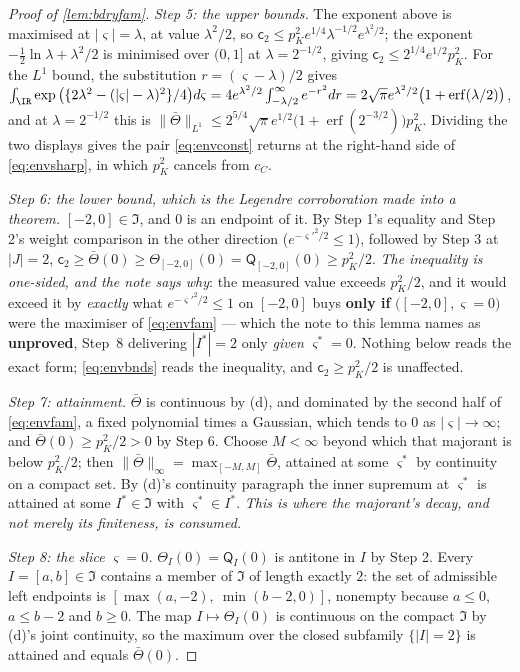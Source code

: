 \begin{proof}[Proof of \cref{lem:bdryfam}]
\emph{Step 5: the upper bounds.} The exponent above is maximised at $|\varsigma|=\lambda$, at value
$\lambda^{2}/2$, so $\mathsf c_2\le p_K^{2}e^{1/4}\lambda^{-1/2}e^{\lambda^{2}/2}$; the exponent
$-\tfrac12\ln\lambda+\lambda^{2}/2$ is minimised over $(0,1]$ at $\lambda=2^{-1/2}$, giving
$\mathsf c_2\le2^{1/4}e^{1/2}p_K^{2}$. For the $L^{1}$ bound, the substitution $r=(\varsigma-\lambda)/2$
gives
$\int_\IR\exp\big(\{2\lambda^{2}-(|\varsigma|-\lambda)^{2}\}/4\big)d\varsigma
=4e^{\lambda^{2}/2}\int_{-\lambda/2}^{\infty}e^{-r^{2}}dr
=2\sqrt\pi e^{\lambda^{2}/2}\big(1+\operatorname{erf}(\lambda/2)\big)$,
and at $\lambda=2^{-1/2}$ this is
$\|\bar\Theta\|_{L^{1}}\le2^{5/4}\sqrt\pi e^{1/2}\big(1+\operatorname{erf}(2^{-3/2})\big)p_K^{2}$.
Dividing the two displays gives the pair \eqref{eq:envconst} returns at the right-hand side of
\eqref{eq:envsharp}, in which $p_K^{2}$ cancels from $c_C$.

\emph{Step 6: the lower bound, which is the Legendre corroboration made into a theorem.}
$[-2,0]\in\mathfrak I$, and $0$ is an endpoint of it. By Step 1's equality and Step 2's weight
comparison in the other direction ($e^{-\varsigma'^{2}/2}\le1$), followed by Step 3 at $|J|=2$,
$\mathsf c_2\ge\bar\Theta(0)\ge\Theta_{[-2,0]}(0)=\mathsf Q_{[-2,0]}(0)\ge p_K^{2}/2$.
\emph{The inequality is one-sided, and the note says why}: the measured value exceeds $p_K^{2}/2$, and
it would exceed it by \emph{exactly} what $e^{-\varsigma'^{2}/2}\le1$ on $[-2,0]$ buys \textbf{only if}
$\big([-2,0],\varsigma=0\big)$ were the maximiser of \eqref{eq:envfam} --- which the note to this lemma
names as \textbf{unproved}, Step~8 delivering $|I^\ast|=2$ only \emph{given} $\varsigma^\ast=0$. Nothing
below reads the exact form; \eqref{eq:envbnds} reads the inequality, and
$\mathsf c_2\ge p_K^{2}/2$ is unaffected.

\emph{Step 7: attainment.} $\bar\Theta$ is continuous by \textup{(d)}, and dominated by the second half
of \eqref{eq:envfam}, a fixed polynomial times a Gaussian, which tends to $0$ as $|\varsigma|\to\infty$;
and $\bar\Theta(0)\ge p_K^{2}/2>0$ by Step 6. Choose $M<\infty$ beyond which that majorant is below
$p_K^{2}/2$; then $\|\bar\Theta\|_\infty=\max_{[-M,M]}\bar\Theta$, attained at some $\varsigma^\ast$ by
continuity on a compact set. By \textup{(d)}'s continuity paragraph the inner supremum at $\varsigma^\ast$
is attained at some $I^\ast\in\mathfrak I$ with $\varsigma^\ast\in I^\ast$. \emph{This is where the
majorant's decay, and not merely its finiteness, is consumed.}

\emph{Step 8: the slice $\varsigma=0$.} $\Theta_I(0)=\mathsf Q_I(0)$ is antitone in $I$ by Step 2. Every
$I=[a,b]\in\mathfrak I$ contains a member of $\mathfrak I$ of length exactly $2$: the set of admissible
left endpoints is $[\max(a,-2),\ \min(b-2,0)]$, nonempty because $a\le0$, $a\le b-2$ and $b\ge0$. The map
$I\mapsto\Theta_I(0)$ is continuous on the compact $\mathfrak I$ by \textup{(d)}'s joint continuity, so
the maximum over the closed subfamily $\{|I|=2\}$ is attained and equals $\bar\Theta(0)$.
\end{proof}

